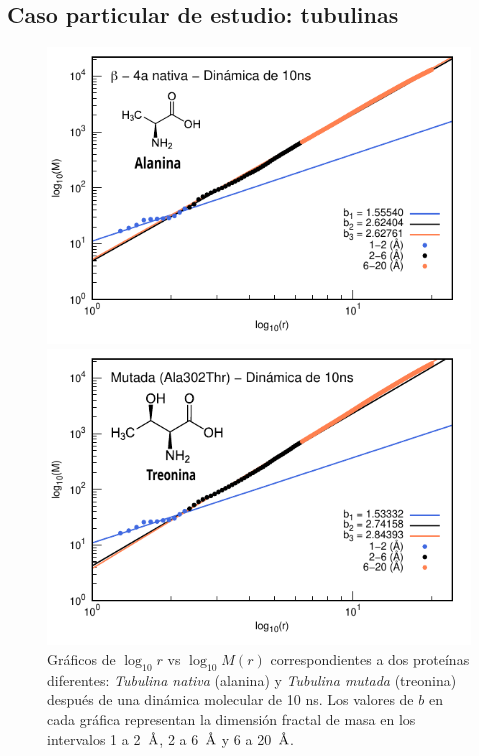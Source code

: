 	
	\subsection{Caso particular de estudio: tubulinas}
	\label{tubulinas}
	
	\begin{figure}[H]
		\hspace{-0.3cm} 
		\begin{minipage}{0.49\textwidth}
			\centering
			\includegraphics[width=\linewidth,page=1]{graphs/PDBs/Tubb4/TubNat10ns.pdf}
		\end{minipage}
		\hspace{0.2cm}
		\begin{minipage}{0.49\textwidth}
			\centering
			\includegraphics[width=\linewidth,page=1]{graphs/PDBs/Tubb4/TubMut10ns.pdf}
		\end{minipage}
		
		
		\caption{
			Gr\'{a}ficos de $\log_{10}r$ vs $\log_{10}M(r)$ correspondientes a dos prote\'{i}nas diferentes: \textit{Tubulina nativa} (alanina) y \textit{Tubulina mutada} (treonina) despu\'{e}s de una din\'{a}mica molecular de 10 ns. Los valores de $b$ en cada gr\'{a}fica representan la dimensi\'{o}n fractal de masa en los intervalos 1 a 2~$\textup{\r{A}}$, 2 a 6~$\textup{\r{A}}$ y 6 a 20~$\textup{\r{A}}$.}
		\label{fig:Tubs}
	\end{figure}
	
